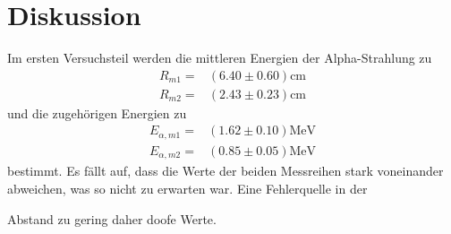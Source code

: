 \section{Diskussion}
\label{sec:Diskussion}

Im ersten Versuchsteil werden die mittleren Energien der Alpha-Strahlung zu
\begin{align*}
    R_{m1}=& (6.40 \pm 0.60)\si{\centi\meter}\\
    R_{m2}=& (2.43 \pm 0.23)\si{\centi\meter}
\end{align*}
und die zugehörigen Energien zu
\begin{align*}
    E_{\alpha, m1}=& (1.62 \pm 0.10)\si{\mega\eV}\\
    E_{\alpha, m2}=& (0.85 \pm 0.05)\si{\mega\eV}
\end{align*}
bestimmt.
Es fällt auf, dass die Werte der beiden Messreihen stark voneinander abweichen, was so nicht zu erwarten war.
Eine Fehlerquelle in der 

 
Abstand zu gering daher doofe Werte.